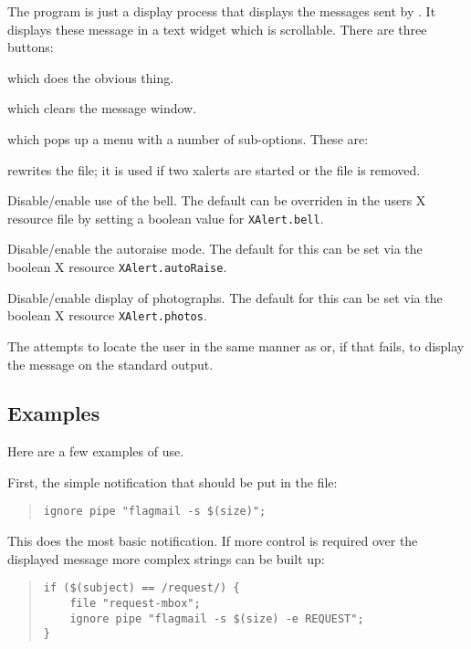 The  program is just a display process that
displays the messages sent by . It displays these message
in a text widget which is scrollable. There are three buttons:
\begin{describe}
\item[\verb|Quit|:] which does the obvious thing.
\item[\verb|Clear|:] which clears the message window.
\item[\verb|Options|:] which pops up a menu with a number of
sub-options. These are:
    \begin{describe}
    \item[\verb|Reset|:] rewrites the  file; it is used if
    two xalerts are started or the  file is removed.
    \item[\verb|Bell|:] Disable/enable use of the bell. The default
can be overriden in the users X resource file by setting a boolean
value for \verb|XAlert.bell|. 
    \item[\verb|Autoraise|:] Disable/enable the autoraise mode. The
default for this can be set via the boolean X resource \verb|XAlert.autoRaise|.
    \item[\verb|Photos|:] Disable/enable display of photographs. The
default for this can be set via the boolean X resource \verb|XAlert.photos|.
    \end{describe}
\end{describe}

The  attempts to locate the user in the same manner as
 or, if that fails, to display the message on the standard
output.

\subsection{Examples}

Here are a few examples of use.

First, the simple notification that should be put in the
 file:
\begin{quote}\small\begin{verbatim}
ignore pipe "flagmail -s $(size)";
\end{verbatim}\end{quote}
This does the most basic notification. If more control is required
over the displayed message more complex strings can be built up:
\begin{quote}\small\begin{verbatim}
if ($(subject) == /request/) {
    file "request-mbox";
    ignore pipe "flagmail -s $(size) -e REQUEST";
}
\end{verbatim}\end{quote}

